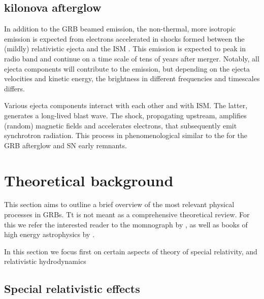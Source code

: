 \subsection{kilonova afterglow}

In addition to the \ac{GRB} beamed emission, the non-thermal, more isotropic emission is expected from electrons accelerated in shocks formed between the (mildly) relativistic ejecta and the \ac{ISM} \citep{Nakar:2011cw}. This emission is expected to peak in radio band and continue on a time scale of tens of years after merger. Notably, all ejecta components will contribute to the emission, but  depending on the ejecta velocities and kinetic energy, the brightness in different frequencies and timescales differs. 

Various ejecta components interact with each other and with \ac{ISM}. The latter, generates a long-lived blast wave. The shock, propagating upstream, amplifies (random) magnetic fields and accelerates electrons, that subsequently emit synchrotron radiation. This process in phenomenological similar to the for the \ac{GRB} afterglow and \ac{SN} early remnants. 




\section{Theoretical background}

This section aims to outline a brief overview of the most relevant physical processes in GRBs. Tt is not meant as a comprehensive theoretical review. For this we refer the interested reader to the momnograph by \citet{RybickiLightman:1985}, as well as books of high energy astrophysics by \citet{Longair:2011,Dermer:2009}.

In this section we focus first on certain aspects of theory of special relativity, and relativistic hydrodynamics 


\subsection{Special relativistic effects}


